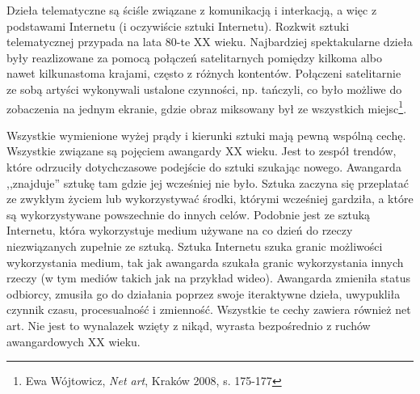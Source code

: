 \documentclass[a4paper,12pt,twoside]{article}
\begin{document}
Dzieła telematyczne są ściśle związane z komunikacją i interkacją, a więc
z podstawami Internetu (i oczywiście sztuki Internetu). Rozkwit sztuki
telematycznej przypada na lata 80-te XX wieku. Najbardziej spektakularne
dzieła były reazlizowane za pomocą połączeń satelitarnych pomiędzy kilkoma
albo nawet kilkunastoma krajami, często z różnych kontentów. Połączeni
satelitarnie ze sobą artyści wykonywali ustalone czynności, np. tańczyli,
co było możliwe do zobaczenia na jednym ekranie, gdzie obraz miksowany był ze
wszystkich miejsc\footnote{Ewa Wójtowicz, \textit{Net art}, Kraków 2008,
s. 175-177}.

Wszystkie wymienione wyżej prądy i kierunki sztuki mają pewną wspólną cechę.
Wszystkie związane są pojęciem awangardy XX wieku. Jest to zespół trendów,
które odrzuciły dotychczasowe podejście do sztuki szukając nowego.
Awangarda ,,znajduje'' sztukę tam gdzie jej wcześniej nie było. Sztuka
zaczyna się przeplatać ze zwykłym życiem lub wykorzystywać środki, którymi
wcześniej gardziła, a które są wykorzystywane powszechnie do innych celów.
Podobnie jest ze sztuką Internetu, która wykorzystuje medium używane na co
dzień do rzeczy niezwiązanych zupełnie ze sztuką. Sztuka Internetu szuka
granic możliwości wykorzystania medium, tak jak awangarda szukała granic
wykorzystania innych rzeczy (w tym mediów takich jak na przykład wideo).
Awangarda zmieniła status odbiorcy, zmusiła go do działania poprzez
swoje iteraktywne dzieła, uwypukliła czynnik czasu, procesualność i zmienność.
Wszystkie te cechy zawiera również net art. Nie jest to wynalazek wzięty
z nikąd, wyrasta bezpośrednio z ruchów awangardowych XX wieku.

\end{document}
